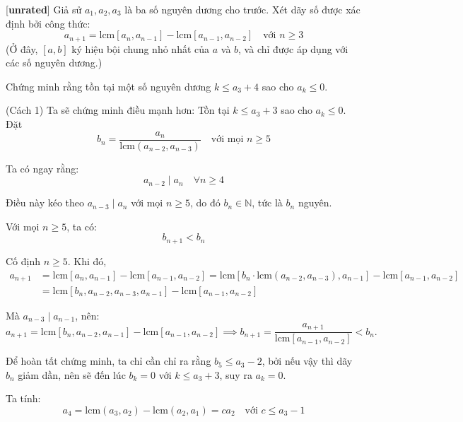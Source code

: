 \documentclass[../01-divisibility.tex]{subfiles}
\begin{document}
\begin{example*}\label{example:IRN-2015-TST-D3-P2}[\textbf{unrated}]
	Giả sử \( a_1, a_2, a_3 \) là ba số nguyên dương cho trước. Xét dãy số được xác định bởi công thức:
	\[
		a_{n+1} = \text{lcm}[a_n, a_{n-1}] - \text{lcm}[a_{n-1}, a_{n-2}] \quad \text{với } n \geq 3
	\]
	(Ở đây, \( [a, b] \) ký hiệu bội chung nhỏ nhất của \( a \) và \( b \), và chỉ được áp dụng với các số nguyên dương.)

	Chứng minh rằng tồn tại một số nguyên dương \( k \leq a_3 + 4 \) sao cho \( a_k \leq 0 \).
\end{example*}

\begin{soln}(Cách 1)\footnotemark
	Ta sẽ chứng minh điều mạnh hơn: Tồn tại \( k \leq a_3 + 3 \) sao cho \( a_k \leq 0 \).
	Đặt
	\[
		b_n = \frac{a_n}{\text{lcm}(a_{n-2}, a_{n-3})} \quad \text{với mọi } n \geq 5
	\]
	
	Ta có ngay rằng:
	\[
		a_{n-2} \mid a_n \quad \forall n \geq 4
	\]

	Điều này kéo theo \( a_{n-3} \mid a_n \) với mọi \( n \geq 5 \), do đó \( b_n \in \mathbb{N} \), tức là \( b_n \) nguyên.
	
	\begin{claim*}
		Với mọi \( n \geq 5 \), ta có:
		\[
			b_{n+1} < b_n
		\]
	\end{claim*}
	\begin{subproof}
		Cố định \( n \geq 5 \). Khi đó,
		\begin{align*}
			a_{n+1} &= \text{lcm}[a_n, a_{n-1}] - \text{lcm}[a_{n-1}, a_{n-2}]
			= \text{lcm}[b_n \cdot \text{lcm}(a_{n-2}, a_{n-3}), a_{n-1}] - \text{lcm}[a_{n-1}, a_{n-2}] \\
			&= \text{lcm}[b_n, a_{n-2}, a_{n-3}, a_{n-1}] - \text{lcm}[a_{n-1}, a_{n-2}]
		\end{align*}

		Mà \( a_{n-3} \mid a_{n-1} \), nên:
		\[
			a_{n+1} = \text{lcm}[b_n, a_{n-2}, a_{n-1}] - \text{lcm}[a_{n-1}, a_{n-2}]
			\implies b_{n+1} = \frac{a_{n+1}}{\text{lcm}[a_{n-1}, a_{n-2}]} < b_n.
		\]
	\end{subproof}
	
	Để hoàn tất chứng minh, ta chỉ cần chỉ ra rằng \( b_5 \leq a_3 - 2 \), bởi nếu vậy thì dãy \( b_n \) giảm dần,
	nên sẽ đến lúc \( b_k = 0 \) với \( k \leq a_3 + 3 \), suy ra \( a_k = 0 \).
	
	Ta tính:
	\[
		a_4 = \text{lcm}(a_3, a_2) - \text{lcm}(a_2, a_1) = c a_2 \quad \text{với } c \leq a_3 - 1
	\]
	

\end{soln}
\end{document}
